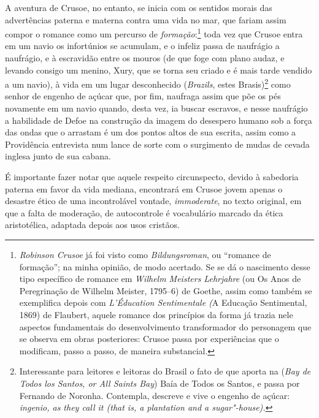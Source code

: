A aventura de Crusoe, no entanto, se inicia com os sentidos morais das
advertências paterna e materna contra uma vida no mar, que fariam assim
compor o romance como um percurso de \emph{formação}:\footnote{\emph{Robinson
  Crusoe} já foi visto como \emph{Bildungsroman}, ou ``romance de
  formação''; na minha opinião, de modo acertado. Se se dá o nascimento
  desse tipo específico de romance em \emph{Wilhelm Meisters Lehrjahre}
  (ou Os Anos de Peregrinação de Wilhelm Meister, 1795--6) de Goethe,
  assim como também se exemplifica depois com \emph{L'Éducation
  Sentimentale (}A Educação Sentimental, 1869) de Flaubert, aquele
  romance dos princípios da forma já trazia nele aspectos fundamentais
  do desenvolvimento transformador do personagem que se observa em obras
  posteriores: Crusoe passa por experiências que o modificam, passo a
  passo, de maneira substancial.} toda vez que Crusoe entra em um navio
os infortúnios se acumulam, e o infeliz passa de naufrágio a naufrágio,
e à escravidão entre os mouros (de que foge com plano audaz, e levando
consigo um menino, Xury, que se torna seu criado e é mais tarde vendido
a um navio), à vida em um lugar desconhecido (\emph{Brazils}, estes
Brasis)\footnote{Interessante para leitores e leitoras do Brasil o fato
  de que aporta na (\emph{Bay de Todos los Santos, or All Saints Bay})
  Baía de Todos os Santos, e passa por Fernando de Noronha. Contempla,
  descreve e vive o engenho de açúcar: \emph{ingenio, as they call it
  (that is, a plantation and a sugar"-house).}} como senhor de engenho de
açúcar que, por fim, naufraga assim que põe os pés novamente em um navio
quando, desta vez, ia buscar escravos, e nesse naufrágio a habilidade de
Defoe na construção da imagem do desespero humano sob a força das ondas
que o arrastam é um dos pontos altos de sua escrita, assim como a
Providência entrevista num lance de sorte com o surgimento de mudas de
cevada inglesa junto de sua cabana.

É importante
fazer notar que aquele respeito circunspecto, devido à sabedoria paterna
em favor da vida mediana, encontrará em Crusoe jovem apenas o desastre
ético de uma incontrolável vontade, \emph{immoderate}, no texto
original, em que a falta de moderação, de autocontrole é vocabulário
marcado da ética aristotélica, adaptada depois aos usos cristãos.

